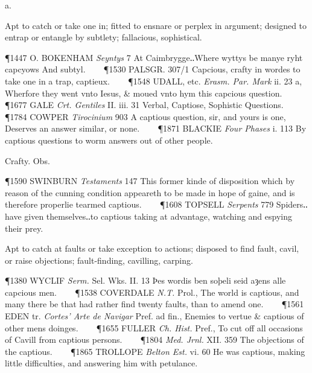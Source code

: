 \begin{description}[wide, labelwidth=!, labelindent=0pt]
 a.

\noindent {}

\vspace{-0.3cm}

\begin{myenumerate}

 Apt to catch or take one in; fitted to ensnare or perplex in argument; designed to entrap or entangle by subtlety; fallacious, sophistical.

\P 1447 O. BOKENHAM  \textit{Seyntys} 7 At Caimbrygge‥Where wyttys be manye ryht capcyows And subtyl.    
\P 1530 PALSGR.  307/1 Capcious, crafty in wordes to take one in a trap, captieux.    
\P 1548 UDALL, etc. \textit{Erasm. Par. Mark} ii. 23 a, Wherfore they went vnto Iesus, \& moued vnto hym this capcious question.    
\P 1677 GALE  \textit{Crt. Gentiles} II. iii. 31 Verbal, Captiose, Sophistic Questions.    
\P 1784 COWPER  \textit{Tirocinium} 903 A captious question, sir, and yours is one, Deserves an answer similar, or none.    
\P 1871 BLACKIE  \textit{Four Phases} i. 113 By captious questions to worm answers out of other people.

 Crafty. Obs.

\P 1590 SWINBURN  \textit{Testaments} 147 This former kinde of disposition which by reason of the cunning condition appeareth to be made in hope of gaine, and is therefore properlie tearmed captious.    
\P 1608 TOPSELL  \textit{Serpents} 779 Spiders‥have given themselves‥to captious taking at advantage, watching and espying their prey.

 Apt to catch at faults or take exception to actions; disposed to find fault, cavil, or raise objections; fault-finding, cavilling, carping.

\P 1380 WYCLIF  \textit{Serm.} Sel. Wks. II. 13 Þes wordis ben soþeli seid aȝens alle capcious men.    
\P 1538 COVERDALE  \textit{N.T.} Prol., The world is captious, and many there be that had rather find twenty faults, than to amend one.    
\P 1561 EDEN tr. \textit{Cortes' Arte de Navigar} Pref. ad fin., Enemies to vertue \& captious of other mens doinges.    
\P 1655 FULLER  \textit{Ch. Hist.} Pref., To cut off all occasions of Cavill from captious persons.    
\P 1804 \textit{Med. Jrnl.} XII. 359 The objections of the captious.    
\P 1865 TROLLOPE  \textit{Belton Est.} vi. 60 He was captious, making little difficulties, and answering him with petulance.


\end{myenumerate}
\end{description}
